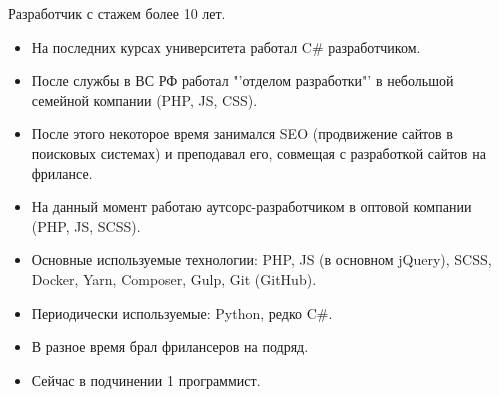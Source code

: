 \documentclass[10pt]{tpl/developercv} %
\begin{document}
\vspace{0.5cm}




\begin{minipage}[t]{0.45\textwidth} %
	\vspace{-\baselineskip} %

	Разработчик с стажем более 10 лет.
  \bigskip
  \small{
    \begin{itemize}[leftmargin=1pt]
      \item На последних курсах университета работал C\# разработчиком.
      \item После службы в ВС РФ работал "'отделом разработки"' в небольшой семейной компании (PHP, JS, CSS).
      \item После этого некоторое время занимался SEO (продвижение сайтов в поисковых системах) и преподавал его, совмещая с разработкой сайтов на фрилансе.
      \item На данный момент работаю аутсорс-разработчиком в оптовой компании (PHP, JS, SCSS).
      \item Основные используемые технологии: PHP, JS (в основном jQuery), SCSS, Docker, Yarn, Composer, Gulp, {Git (GitHub)}.
      \item Периодически используемые: Python, редко C\#.
      \item В разное время брал фрилансеров на подряд.
      \item Сейчас в подчинении 1 программист.
    \end{itemize}
  }
\end{minipage}
\hfill %
\begin{minipage}[t]{0.5\textwidth} %
	\vspace{-\baselineskip} %
	\begin{barchart}{5.5}
	\end{barchart}
\end{minipage}
\end{document}

